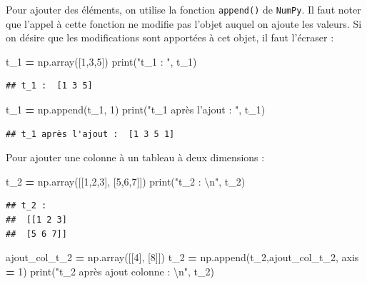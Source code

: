 \documentclass[12pt,]{book}
\newenvironment{Shaded}{\begin{snugshade}}{\end{snugshade}}
\newcommand{\DecValTok}[1]{\textcolor[rgb]{0.00,0.00,0.81}{#1}}
\newcommand{\CharTok}[1]{\textcolor[rgb]{0.31,0.60,0.02}{#1}}
\newcommand{\StringTok}[1]{\textcolor[rgb]{0.31,0.60,0.02}{#1}}
\newcommand{\OperatorTok}[1]{\textcolor[rgb]{0.81,0.36,0.00}{\textbf{#1}}}
\newcommand{\BuiltInTok}[1]{#1}
\newcommand{\NormalTok}[1]{#1}
\numberwithin{equation}{section}
\numberwithin{countremarque}{section}
\begin{document}
Pour ajouter des éléments, on utilise la fonction \texttt{append()} de
\texttt{NumPy}. Il faut noter que l'appel à cette fonction ne modifie
pas l'objet auquel on ajoute les valeurs. Si on désire que les
modifications sont apportées à cet objet, il faut l'écraser :

\begin{Shaded}
\begin{Highlighting}[]
\NormalTok{t_1 }\OperatorTok{=}\NormalTok{ np.array([}\DecValTok{1}\NormalTok{,}\DecValTok{3}\NormalTok{,}\DecValTok{5}\NormalTok{])}
\BuiltInTok{print}\NormalTok{(}\StringTok{"t_1 : "}\NormalTok{, t_1)}
\end{Highlighting}
\end{Shaded}

\begin{lstlisting}
## t_1 :  [1 3 5]
\end{lstlisting}

\begin{Shaded}
\begin{Highlighting}[]
\NormalTok{t_1 }\OperatorTok{=}\NormalTok{ np.append(t_1, }\DecValTok{1}\NormalTok{)}
\BuiltInTok{print}\NormalTok{(}\StringTok{"t_1 après l'ajout : "}\NormalTok{, t_1)}
\end{Highlighting}
\end{Shaded}

\begin{lstlisting}
## t_1 après l'ajout :  [1 3 5 1]
\end{lstlisting}

Pour ajouter une colonne à un tableau à deux dimensions :

\begin{Shaded}
\begin{Highlighting}[]
\NormalTok{t_2 }\OperatorTok{=}\NormalTok{ np.array([[}\DecValTok{1}\NormalTok{,}\DecValTok{2}\NormalTok{,}\DecValTok{3}\NormalTok{], [}\DecValTok{5}\NormalTok{,}\DecValTok{6}\NormalTok{,}\DecValTok{7}\NormalTok{]])}
\BuiltInTok{print}\NormalTok{(}\StringTok{"t_2 : }\CharTok{\textbackslash{}n}\StringTok{"}\NormalTok{, t_2)}
\end{Highlighting}
\end{Shaded}

\begin{lstlisting}
## t_2 : 
##  [[1 2 3]
##  [5 6 7]]
\end{lstlisting}

\begin{Shaded}
\begin{Highlighting}[]
\NormalTok{ajout_col_t_2 }\OperatorTok{=}\NormalTok{ np.array([[}\DecValTok{4}\NormalTok{], [}\DecValTok{8}\NormalTok{]])}
\NormalTok{t_2 }\OperatorTok{=}\NormalTok{ np.append(t_2,ajout_col_t_2, axis }\OperatorTok{=} \DecValTok{1}\NormalTok{)}
\BuiltInTok{print}\NormalTok{(}\StringTok{"t_2 après ajout colonne : }\CharTok{\textbackslash{}n}\StringTok{"}\NormalTok{, t_2)}
\end{Highlighting}
\end{Shaded}
\end{document}
